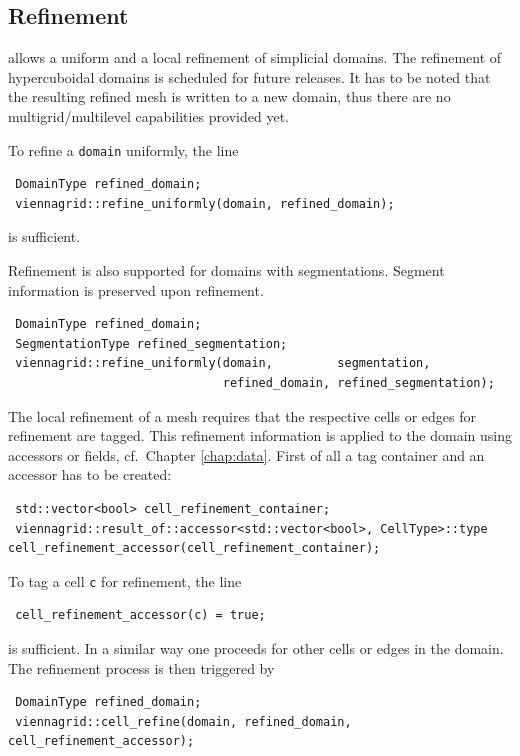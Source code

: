

 \subsection{Refinement}
 {\ViennaGridversion} allows a uniform and a local refinement of simplicial domains. The refinement of hypercuboidal domains is scheduled for future releases.
It has to be noted that the resulting refined mesh is written to a new domain, thus there are no multigrid/multilevel capabilities provided yet.

 To refine a \lstinline|domain| uniformly, the line
 \begin{lstlisting}
 DomainType refined_domain;
 viennagrid::refine_uniformly(domain, refined_domain);
 \end{lstlisting}
 is sufficient.
 
 Refinement is also supported for domains with segmentations. Segment information is preserved upon refinement.
 \begin{lstlisting}
 DomainType refined_domain;
 SegmentationType refined_segmentation;
 viennagrid::refine_uniformly(domain,         segmentation,
                              refined_domain, refined_segmentation);
 \end{lstlisting}

 The local refinement of a mesh requires that the respective cells or edges for refinement are tagged. This refinement information is applied to the domain using accessors or fields, cf.~Chapter \ref{chap:data}.
 First of all a tag container and an accessor has to be created:
 \begin{lstlisting}
 std::vector<bool> cell_refinement_container;
 viennagrid::result_of::accessor<std::vector<bool>, CellType>::type cell_refinement_accessor(cell_refinement_container);
 \end{lstlisting}
 
 
 To tag a cell \lstinline|c| for refinement, the line
 \begin{lstlisting}
 cell_refinement_accessor(c) = true;
 \end{lstlisting}
 is sufficient. In a similar way one proceeds for other cells or edges in the domain. The refinement process is then triggered by
 \begin{lstlisting}
 DomainType refined_domain;
 viennagrid::cell_refine(domain, refined_domain, cell_refinement_accessor);
 \end{lstlisting}
 

